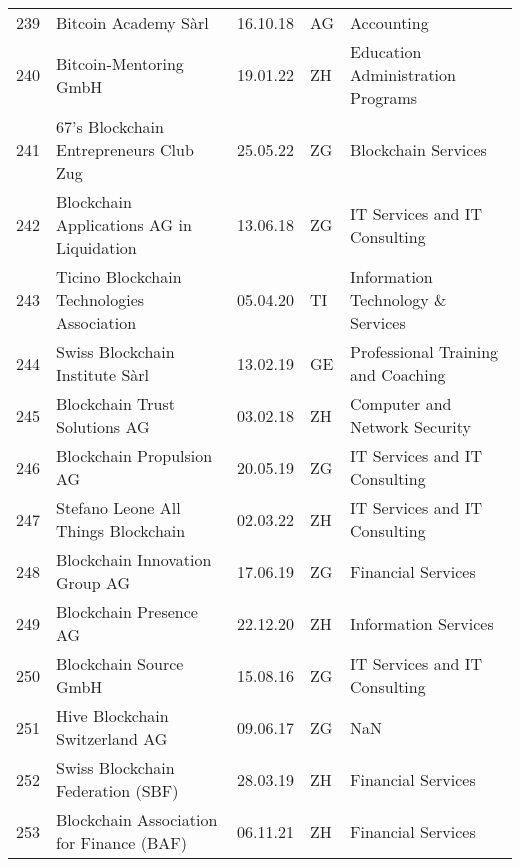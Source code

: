 \begin{tabular}{lllll}
239 &                               Bitcoin Academy Sàrl &      16.10.18 &     AG &                                     Accounting \\
240 &                             Bitcoin-Mentoring GmbH &      19.01.22 &     ZH &              Education Administration Programs \\
241 &             67's Blockchain Entrepreneurs Club Zug &      25.05.22 &     ZG &                            Blockchain Services \\
242 &          Blockchain Applications AG in Liquidation &      13.06.18 &     ZG &                  IT Services and IT Consulting \\
243 &         Ticino Blockchain Technologies Association &      05.04.20 &     TI &              Information Technology \& Services \\
244 &                    Swiss Blockchain Institute Sàrl &      13.02.19 &     GE &             Professional Training and Coaching \\
245 &                      Blockchain Trust Solutions AG &      03.02.18 &     ZH &                  Computer and Network Security \\
246 &                           Blockchain Propulsion AG &      20.05.19 &     ZG &                  IT Services and IT Consulting \\
247 &                Stefano Leone All Things Blockchain &      02.03.22 &     ZH &                  IT Services and IT Consulting \\
248 &                     Blockchain Innovation Group AG &      17.06.19 &     ZG &                             Financial Services \\
249 &                             Blockchain Presence AG &      22.12.20 &     ZH &                           Information Services \\
250 &                             Blockchain Source GmbH &      15.08.16 &     ZG &                  IT Services and IT Consulting \\
251 &                     Hive Blockchain Switzerland AG &      09.06.17 &     ZG &                                            NaN \\
252 &                  Swiss Blockchain Federation (SBF) &      28.03.19 &     ZH &                             Financial Services \\
253 &           Blockchain Association for Finance (BAF) &      06.11.21 &     ZH &                             Financial Services \\

\end{tabular}
